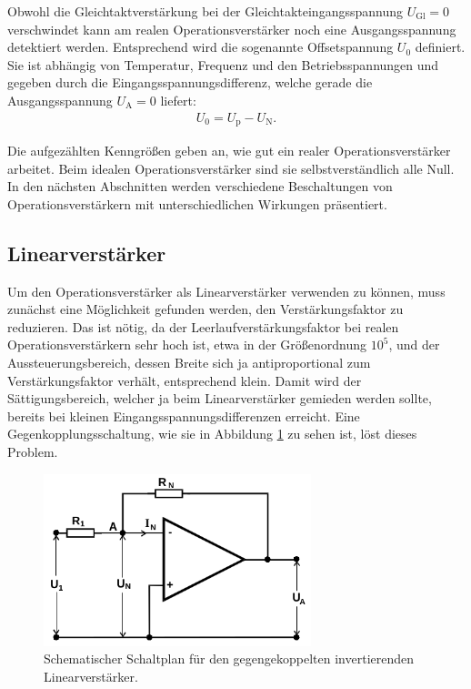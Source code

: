 Obwohl die Gleichtaktverstärkung bei der Gleichtakteingangsspannung $U_\text{Gl} = 0$ verschwindet
kann am realen Operationsverstärker noch eine Ausgangsspannung detektiert werden. Entsprechend wird die sogenannte
Offsetspannung $U_0$ definiert. Sie ist abhängig von Temperatur, Frequenz und den Betriebsspannungen und gegeben
durch die Eingangsspannungsdifferenz, welche gerade die Ausgangsspannung $U_\text{A} = 0$ liefert:
\begin{align}
  U_0 = U_\text{p} - U_\text{N}.
\end{align}

Die aufgezählten Kenngrößen geben an, wie gut ein realer Operationsverstärker arbeitet. Beim idealen
Operationsverstärker sind sie selbstverständlich alle Null. In den nächsten Abschnitten werden verschiedene
Beschaltungen von Operationsverstärkern mit unterschiedlichen Wirkungen präsentiert.

\subsection{Linearverstärker}
\label{sec:linv}

Um den Operationsverstärker als Linearverstärker verwenden zu können, muss zunächst eine Möglichkeit gefunden werden,
den Verstärkungsfaktor zu reduzieren. Das ist nötig, da der Leerlaufverstärkungsfaktor bei realen Operationsverstärkern
sehr hoch ist, etwa in der Größenordnung $10^5$, und der Aussteuerungsbereich, dessen Breite sich ja antiproportional
zum Verstärkungsfaktor verhält, entsprechend klein. Damit wird der Sättigungsbereich, welcher ja beim Linearverstärker
gemieden werden sollte, bereits bei kleinen Eingangsspannungsdifferenzen erreicht.
Eine Gegenkopplungsschaltung, wie sie in Abbildung \ref{fig:gegenkopplung} zu sehen ist, löst dieses Problem.

\begin{figure}
  \centering
  \includegraphics[height=5cm]{ImmerDieseNorweger/gegenkopplung.png}
  \caption{Schematischer Schaltplan für den gegengekoppelten invertierenden Linearverstärker\cite{anleitung}.}
  \label{fig:gegenkopplung}
\end{figure}

